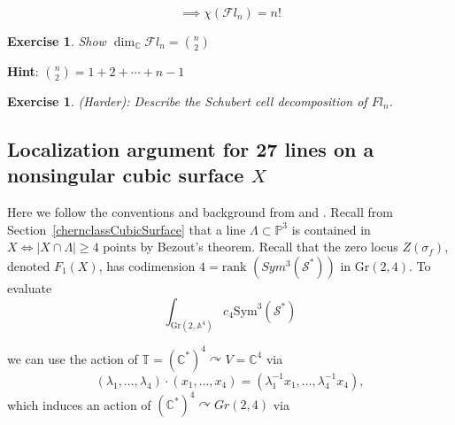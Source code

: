 \documentclass{amsart}
\newtheorem{exc}[theorem]{Exercise}
\newcommand{\PP}{\mathbb{P}}\newcommand{\A}{\mathbb{A}}\newcommand{\Z}{\mathbb{Z}}\newcommand{\C}{\mathbb{C}}\newcommand{\N}{\mathbb{N}}\newcommand{\T}{\mathbb{T}}
\begin{document}
\[ \implies \chi(\mathcal{F}l_n) = n! \] 

\begin{exc} Show $\dim_\C \mathcal{F}l_n = \binom{n}{2}$ \end{exc} \textbf{Hint}: $\binom{n}{2} = 1 + 2 + \cdots + n-1$ 

\begin{exc} (Harder): Describe the Schubert cell decomposition of $Fl_n$. \end{exc} %

\subsection{Localization argument for 27 lines on a nonsingular cubic surface $X$}

\label{sec: loc27lines}
Here we follow the conventions and background from \cite{MSTextbook} and \cite{coxkatxMSAG}. Recall from Section~\ref{chernclassCubicSurface} that a line $\Lambda \subset \PP^3$ is contained in $X \iff |X\cap \Lambda| \geq 4 \text{ points}$ by Bezout's theorem. Recall that the zero locus $Z(\sigma_f)$, denoted $F_1(X)$, has codimension $4 = \text{rank }(Sym^3(\mathcal{S}^*))$ in $\text{Gr}(2,4)$. To evaluate 
\[ \int_{\text{Gr}(2,\A^4)} c_4 \text{Sym}^3(\mathcal{S}^*) \]

we can use the action of $\mathbb{T}=(\C^*)^4 \curvearrowright V = \C^4$ via \[ (\lambda_1, \dots, \lambda_4) \cdot (x_1, \dots, x_4) = (\lambda_1^{-1} x_1, \dots, \lambda_4^{-1}x_4), \] which induces an action of $(\C^*)^4 \curvearrowright Gr(2,4)$ via 
\end{document}
